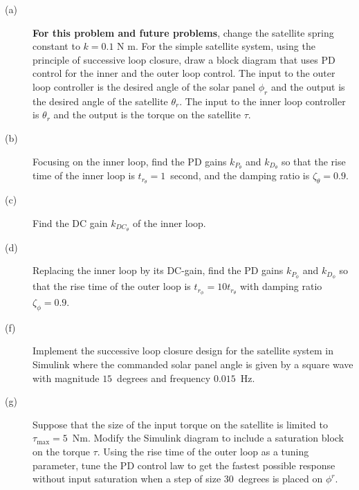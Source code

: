 
\begin{description}
\item[(a)] \textbf{For this problem and future problems}, change the satellite spring constant to $k = 0.1$ N m. For the simple satellite system, using the principle of successive loop closure, draw a block diagram that uses PD control for the inner and the outer loop control. The input to the outer loop controller is the desired angle of the solar panel $\phi_r$ and the output is the desired angle of the satellite $\theta_r$.  The input to the inner loop controller is $\theta_r$ and the output is the torque on the satellite $\tau$.
\item[(b)] Focusing on the inner loop, find the PD gains $k_{P_\theta}$ and $k_{D_\theta}$ so that the rise time of the inner loop is $t_{r_\theta}=1$~second, and the damping ratio is $\zeta_{\theta}=0.9$.
\item[(c)] Find the DC gain $k_{DC_\theta}$ of the inner loop.
\item[(d)] Replacing the inner loop by its DC-gain, find the PD gains $k_{P_\phi}$ and $k_{D_\phi}$ so that the rise time of the outer loop is $t_{r_\phi}= 10 t_{r_\theta}$ with damping ratio $\zeta_{\phi}=0.9$.
\item[(f)] Implement the successive loop closure design for the satellite system in Simulink where the commanded solar panel angle is given by a square wave with magnitude $15$~degrees and frequency $0.015$~Hz.
\item[(g)] Suppose that the size of the input torque on the satellite is limited to $\tau_{\max}=5$~Nm.  Modify the Simulink diagram to include a saturation block on the torque $\tau$.  Using the rise time of the outer loop as a tuning parameter, tune the PD control law to get the fastest possible response without input saturation when a step of size $30$~degrees is placed on $\phi^r$.  
\end{description}

